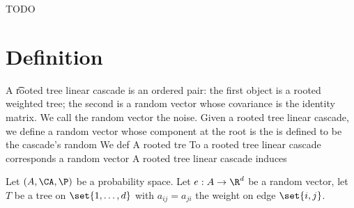
\sbasic







































\sstart
{}


TODO

\section{Definition}

A \t{rooted tree linear cascade} is an ordered pair: the first object is a rooted weighted tree; the second is a random vector whose covariance is the identity matrix.
We call the random vector the noise.
Given a rooted tree linear cascade, we define a random vector whose component at the root is the is defined to be the cascade's random
We def
A rooted tre
To a rooted tree linear cascade corresponds a random vector
A rooted tree linear cascade induces


Let $(A, \CA, \P)$ be a probability space.
Let $e: A \to \R^d$ be a random vector, let $T$ be a tree on $\set{1, \dots, d}$ with $a_{ij} = a_{ji}$ the weight on edge $\set{i, j}$.


\strats

